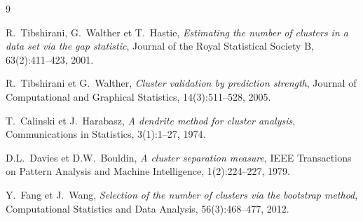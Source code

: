 \documentclass[11pt, a4paper]{article}
\begin{document}
\begin{thebibliography}{9}

  R.~Tibshirani, G.~Walther et T.~Hastie,
  \textit{Estimating the number of clusters in a data set via the gap statistic},
  Journal of the Royal Statistical Society B, 63(2):411--423, 2001.

  R.~Tibshirani et G.~Walther,
  \textit{Cluster validation by prediction strength},
  Journal of Computational and Graphical Statistics, 14(3):511--528, 2005.

  T.~Calinski et J.~Harabasz,
  \textit{A dendrite method for cluster analysis},
  Communications in Statistics, 3(1):1--27, 1974.

  D.L.~Davies et D.W.~Bouldin,
  \textit{A cluster separation measure},
  IEEE Transactions on Pattern Analysis and Machine Intelligence, 1(2):224--227, 1979.

  Y.~Fang et J.~Wang,
  \textit{Selection of the number of clusters via the bootstrap method},
  Computational Statistics and Data Analysis, 56(3):468--477, 2012.

\end{thebibliography}
\end{document}
